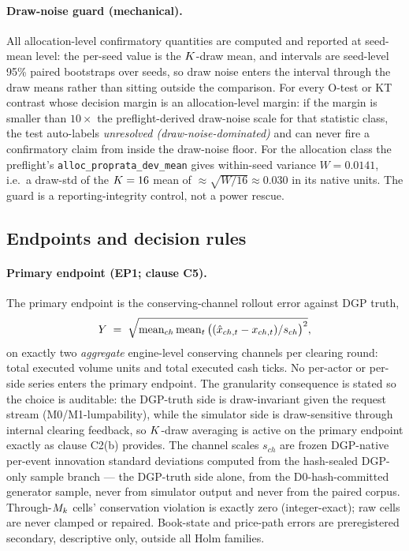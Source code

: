 \paragraph{Draw-noise guard (mechanical).}
All allocation-level confirmatory quantities are computed and reported at
seed-mean level: the per-seed value is the $K$-draw mean, and intervals
are seed-level 95\% paired bootstraps over seeds, so draw noise enters the
interval through the draw means rather than sitting outside the comparison.
For every O-test or KT contrast whose decision margin is an allocation-level
margin: if the margin is smaller than $10\times$ the preflight-derived
draw-noise scale for that statistic class, the test auto-labels
\emph{unresolved (draw-noise-dominated)} and can never fire a confirmatory
claim from inside the draw-noise floor. For the allocation class the
preflight's \texttt{alloc\_proprata\_dev\_mean} gives within-seed variance
$W = 0.0141$, i.e.\ a draw-std of the $K=16$ mean of
${\approx}\sqrt{W/16} \approx 0.030$ in its native units. The guard is a
reporting-integrity control, not a power rescue.

\subsection{Endpoints and decision rules}
\label{sec:cube-endpoints}

\paragraph{Primary endpoint (EP1; clause C5).}
The primary endpoint is the conserving-channel rollout error against DGP
truth,
\[
Y \;=\; \sqrt{\mathrm{mean}_{ch}\,\mathrm{mean}_{t}\,
\bigl((\hat x_{ch,t} - x_{ch,t})/s_{ch}\bigr)^{2}},
\]
on exactly two \emph{aggregate} engine-level conserving channels per clearing
round: total executed volume units and total executed cash ticks. No
per-actor or per-side series enters the primary endpoint. The granularity
consequence is stated so the choice is auditable: the DGP-truth side is
draw-invariant given the request stream (M0/M1-lumpability), while the
simulator side is draw-sensitive through internal clearing feedback, so
$K$-draw averaging is active on the primary endpoint exactly as clause
C2(b) provides. The channel scales $s_{ch}$ are frozen DGP-native per-event
innovation standard deviations computed from the hash-sealed DGP-only sample
branch --- the DGP-truth side alone, from the D0-hash-committed generator
sample, never from simulator output and never from the paired corpus.
Through-$M_k$ cells' conservation violation is exactly zero (integer-exact);
raw cells are never clamped or repaired. Book-state and price-path errors are
preregistered secondary, descriptive only, outside all Holm families.

